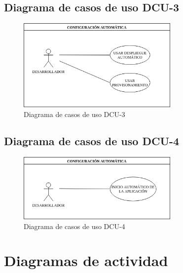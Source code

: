 \subsection{Diagrama de casos de uso DCU-3 }
\begin{figure}[H]
  \begin{center}
    \includegraphics[width=0.7\textwidth]{imagenes/DCU-3.png}
    \caption{Diagrama de casos de uso DCU-3}
    \label{fig:DCU-3}
  \end{center}
\end{figure}
\subsection{Diagrama de casos de uso DCU-4 }
\begin{figure}[H]
  \begin{center}
    \includegraphics[width=0.7\textwidth]{imagenes/DCU-4.png}
    \caption{Diagrama de casos de uso DCU-4}
    \label{fig:DCU-4}
  \end{center}
\end{figure}


\section {Diagramas de actividad}

